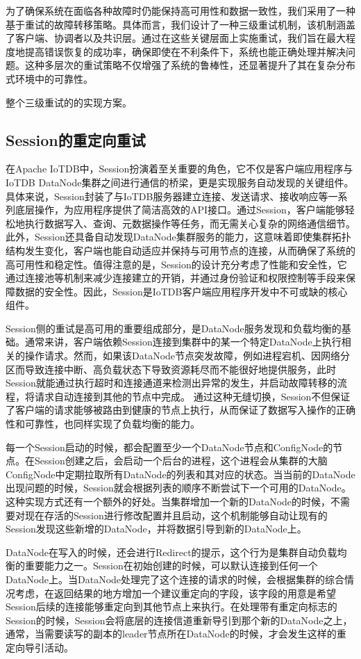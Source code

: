 为了确保系统在面临各种故障时仍能保持高可用性和数据一致性，我们采用了一种基于重试的故障转移策略。具体而言，我们设计了一种三级重试机制，该机制涵盖了客户端、协调者以及共识层。通过在这些关键层面上实施重试，我们旨在最大程度地提高错误恢复的成功率，确保即使在不利条件下，系统也能正确处理并解决问题。这种多层次的重试策略不仅增强了系统的鲁棒性，还显著提升了其在复杂分布式环境中的可靠性。

整个三级重试的的实现方案。

\subsection{Session的重定向重试}

在Apache IoTDB中，Session扮演着至关重要的角色，它不仅是客户端应用程序与IoTDB DataNode集群之间进行通信的桥梁，更是实现服务自动发现的关键组件。具体来说，Session封装了与IoTDB服务器建立连接、发送请求、接收响应等一系列底层操作，为应用程序提供了简洁高效的API接口。通过Session，客户端能够轻松地执行数据写入、查询、元数据操作等任务，而无需关心复杂的网络通信细节。此外，Session还具备自动发现DataNode集群服务的能力，这意味着即使集群拓扑结构发生变化，客户端也能自动适应并保持与可用节点的连接，从而确保了系统的高可用性和稳定性。值得注意的是，Session的设计充分考虑了性能和安全性，它通过连接池等机制来减少连接建立的开销，并通过身份验证和权限控制等手段来保障数据的安全性。因此，Session是IoTDB客户端应用程序开发中不可或缺的核心组件。

Session侧的重试是高可用的重要组成部分，是DataNode服务发现和负载均衡的基础。通常来讲，客户端依赖Session连接到集群中的某一个特定DataNode上执行相关的操作请求。然而，如果该DataNode节点突发故障，例如进程宕机、因网络分区而导致连接中断、高负载状态下导致资源耗尽而不能很好地提供服务，此时Session就能通过执行超时和连接通道来检测出异常的发生，并启动故障转移的流程，将请求自动连接到其他的节点中完成。
通过这种无缝切换，Session不但保证了客户端的请求能够被路由到健康的节点上执行，从而保证了数据写入操作的正确性和可靠性，也同样实现了负载均衡的能力。

每一个Session启动的时候，都会配置至少一个DataNode节点和ConfigNode的节点。在Session创建之后，会启动一个后台的进程，这个进程会从集群的大脑ConfigNode中定期拉取所有DataNode的列表和其对应的状态。当当前的DataNode出现问题的时候，Session就会根据列表的顺序不断尝试下一个可用的DataNode。这种实现方式还有一个额外的好处。当集群增加一个新的DataNode的时候，不需要对现在存活的Session进行修改配置并且启动，这个机制能够自动让现有的Session发现这些新增的DataNode，并将数据引导到新的DataNode上。

DataNode在写入的时候，还会进行Redirect的提示，这个行为是集群自动负载均衡的重要能力之一。Session在初始创建的时候，可以默认连接到任何一个DataNode上。当DataNode处理完了这个连接的请求的时候，会根据集群的综合情况考虑，在返回结果的地方增加一个建议重定向的字段，该字段的用意是希望Session后续的连接能够重定向到其他节点上来执行。在处理带有重定向标志的Session的时候，Session会将底层的连接信道重新导引到那个新的DataNode之上，通常，当需要读写的副本的leader节点所在DataNode的时候，才会发生这样的重定向导引活动。

